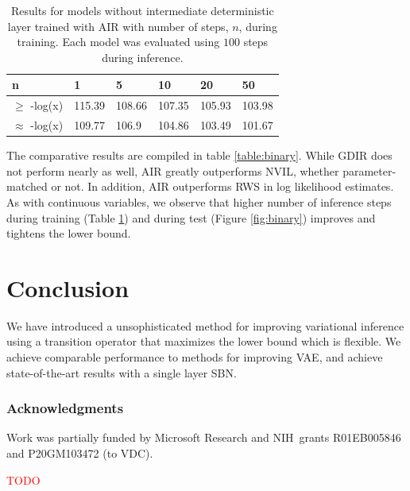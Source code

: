 \documentclass{article} %
\newcommand{\alert}[1]{\textcolor{red}{#1}}
\begin{document}
\begin{table}
\begin{tabular}{ | m{1.4cm} | m{1cm} | m{1cm} | m{1cm} | m{1cm} | m{1cm} |}
\hline
n & 1 & 5 & 10 & 20 & 50 \\
\hline
$\ge$ -log(x) & 115.39 & 108.66 & 107.35 & 105.93 & 103.98 \\
\hline
$\approx$ -log(x) & 109.77 & 106.9 & 104.86 & 103.49 & 101.67 \\
\hline
\end{tabular}
\caption{Results for models without intermediate deterministic layer trained with AIR with number of steps, $n$, during training. Each model was evaluated using $100$ steps during inference.}
\label{table:binary_step}
\end{table}

The comparative results are compiled in table \ref{table:binary}. While GDIR does not perform nearly as well, AIR greatly outperforms NVIL, whether parameter-matched or not. In addition, AIR outperforms RWS in log likelihood estimates. As with continuous variables, we observe that higher number of inference steps during training (Table \ref{table:binary_step}) and during test (Figure \ref{fig:binary}) improves and tightens the lower bound.

\section{Conclusion}
We have introduced a unsophisticated method for improving variational inference using a transition operator that maximizes the lower bound which is flexible. We achieve comparable performance to methods for improving VAE, and achieve state-of-the-art results with a single layer SBN.

\subsubsection*{Acknowledgments}
Work was partially funded by Microsoft Research and NIH\ grants R01EB005846 and P20GM103472 (to VDC).

\alert{TODO}




\end{document}
